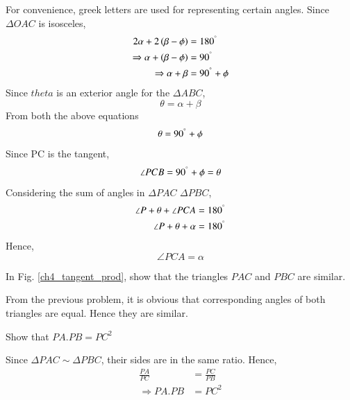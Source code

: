 %
\proof For convenience, greek letters are used for representing certain angles. Since $\Delta OAC$ is isosceles,
%
\begin{align}
2 \alpha + 2 \left(\beta - \phi\right) &= 180^{\degree} \\
\Rightarrow  \alpha +  \left(\beta - \phi\right) &= 90^{\degree} \\
\Rightarrow  \alpha +  \beta  &= 90^{\degree} + \phi
\end{align}
%
Since $theta$ is an exterior angle for the $\Delta ABC
$,
%
\begin{equation}
\theta = \alpha + \beta
\end{equation}
%
From both the above equations
%
\begin{equation}
\theta = 90^{\degree} + \phi
\end{equation}
%
Since PC is the tangent, 
%
\begin{equation}
\angle PCB = 90^{\degree} + \phi = \theta
\end{equation}
%
Considering the sum of angles in $\Delta PAC$ $\Delta PBC$,
%
\begin{align}
\angle P + \theta + \angle PCA &= 180^{\degree} \\
\angle P + \theta + \alpha &= 180^{\degree}
\end{align}
Hence,
%
\begin{equation}
\angle PCA = \alpha
\end{equation}
%
\begin{problem}
	In Fig. \ref{ch4_tangent_prod}, show that the triangles $PAC$ and $PBC$ are similar.
\end{problem}
\proof From the previous problem, it is obvious that corresponding angles of both triangles are equal.  Hence they are similar.
%
\begin{problem}
	Show that $PA.PB = PC^2$
\end{problem}
\proof Since $\Delta PAC \sim \Delta PBC$, their sides are in the same ratio.  Hence,
%
\begin{align}
\frac{PA}{PC} &= \frac{PC}{PB} \\
\Rightarrow PA.PB &=PC^2
\end{align}
%
%
